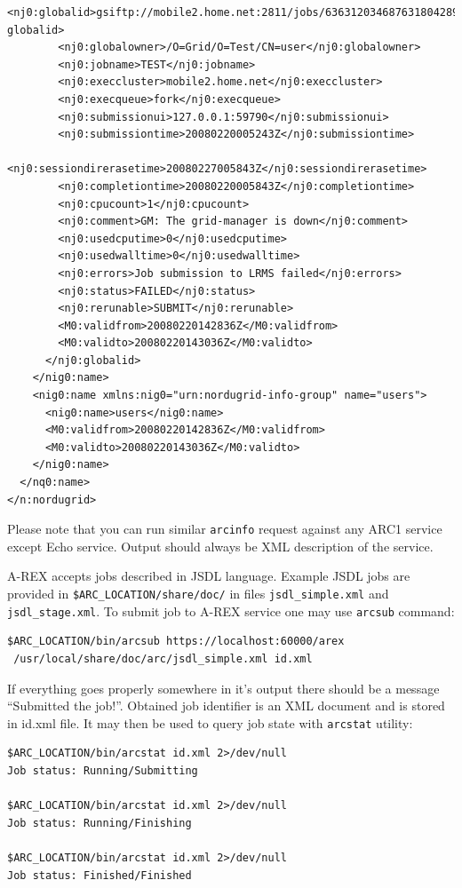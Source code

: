 \documentclass{article}                            %
\begin{document}
\begin{lstlisting}[caption={Example of a good arcinfo output},label=lst:arcinfo]
<nj0:globalid>gsiftp://mobile2.home.net:2811/jobs/636312034687631804289383</nj0:
globalid>
        <nj0:globalowner>/O=Grid/O=Test/CN=user</nj0:globalowner>
        <nj0:jobname>TEST</nj0:jobname>
        <nj0:execcluster>mobile2.home.net</nj0:execcluster>
        <nj0:execqueue>fork</nj0:execqueue>
        <nj0:submissionui>127.0.0.1:59790</nj0:submissionui>
        <nj0:submissiontime>20080220005243Z</nj0:submissiontime>
        <nj0:sessiondirerasetime>20080227005843Z</nj0:sessiondirerasetime>
        <nj0:completiontime>20080220005843Z</nj0:completiontime>
        <nj0:cpucount>1</nj0:cpucount>
        <nj0:comment>GM: The grid-manager is down</nj0:comment>
        <nj0:usedcputime>0</nj0:usedcputime>
        <nj0:usedwalltime>0</nj0:usedwalltime>
        <nj0:errors>Job submission to LRMS failed</nj0:errors>
        <nj0:status>FAILED</nj0:status>
        <nj0:rerunable>SUBMIT</nj0:rerunable>
        <M0:validfrom>20080220142836Z</M0:validfrom>
        <M0:validto>20080220143036Z</M0:validto>
      </nj0:globalid>
    </nig0:name>
    <nig0:name xmlns:nig0="urn:nordugrid-info-group" name="users">
      <nig0:name>users</nig0:name>
      <M0:validfrom>20080220142836Z</M0:validfrom>
      <M0:validto>20080220143036Z</M0:validto>
    </nig0:name>
  </nq0:name>
</n:nordugrid>
\end{lstlisting}

Please note that you can run similar \texttt{arcinfo} request against any ARC1
service except Echo service. Output should always be XML description of the service.

A-REX accepts jobs described in JSDL language. Example JSDL jobs are provided in
\verb|$ARC_LOCATION/share/doc/| in files \verb|jsdl_simple.xml| and
\verb|jsdl_stage.xml|. To submit job to A-REX service one may use
\texttt{arcsub} command:

\begin{lstlisting}
$ARC_LOCATION/bin/arcsub https://localhost:60000/arex
 /usr/local/share/doc/arc/jsdl_simple.xml id.xml
\end{lstlisting}

If everything goes properly somewhere in it's output there should be a message
``Submitted the job!''. Obtained job identifier is an XML document and is stored
in id.xml file. It may then be used to query job state with \texttt{arcstat}
utility:

\begin{lstlisting}
$ARC_LOCATION/bin/arcstat id.xml 2>/dev/null
Job status: Running/Submitting

$ARC_LOCATION/bin/arcstat id.xml 2>/dev/null
Job status: Running/Finishing

$ARC_LOCATION/bin/arcstat id.xml 2>/dev/null
Job status: Finished/Finished
\end{lstlisting}
\end{document}
